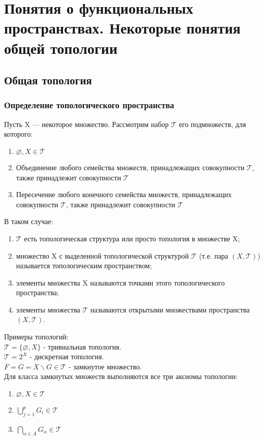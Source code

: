 \chapter{Понятия о функциональных пространствах.
 Некоторые понятия общей топологии}
\section{Общая топология}
\subsection{Определение топологического пространства}

Пусть X — некоторое множество. Рассмотрим набор $\mathcal{T}$ его подмножеств, для которого: 
\begin{enumerate}
    \item $\varnothing, X \in \mathcal{T}$
    \item Объединение любого семейства множеств, принадлежащих совокупности $\mathcal{T}$, также принадлежит совокупности $\mathcal{T}$
    \item Пересечение любого конечного семейства множеств, принадлежащих совокупности $\mathcal{T}$, также принадлежит совокупности $\mathcal{T}$
\end{enumerate}
В таком случае: 
\begin{enumerate}
    \item $\mathcal{T}$ есть топологическая структура или просто топология в множестве X; 
    \item   множество X с выделенной топологической структурой $\mathcal{T}$ (т.е. пара $(X, \mathcal{T})$) называется топологическим пространством;
    \item   элементы множества X называются точками этого топологического пространства; 
    \item   элементы множества $\mathcal{T}$ называются открытыми множествами пространства $(X, \mathcal{T})$. 
\end{enumerate}
Примеры топологий: \\
$\mathcal{T} = \{\varnothing, X\}$ - тривиальная топология. \\
$\mathcal{T} = 2^X$ - дискретная топология. \\ 
$F = \overline{G} = X \backslash G \in \mathcal{T}$ - замкнутое множество.\\
Для класса замкнутых множеств выполняются все три аксиомы топологии:
\begin{enumerate}
    \item $\varnothing, X \in \mathcal{T}$
    \item $\bigcup\limits_{j=1}^p G_i \in \mathcal{T}$
    \item $\bigcap\limits_{\alpha \in A} G_\alpha \in \mathcal{T}$ 
\end{enumerate}
